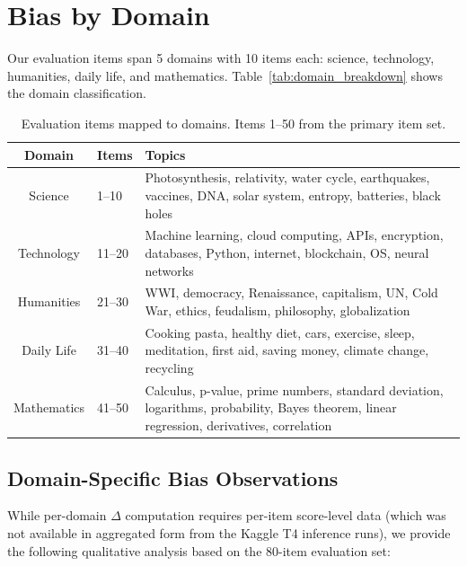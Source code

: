 \section{Bias by Domain}
\label{app:domain_breakdown}

Our evaluation items span 5 domains with 10 items each: science, technology, humanities, daily life, and mathematics. Table~\ref{tab:domain_breakdown} shows the domain classification.

\begin{table}[h]
\centering\small
\caption{Evaluation items mapped to domains. Items 1--50 from the primary item set.}
\label{tab:domain_labels}
\begin{tabular}{cll}
\toprule
\textbf{Domain} & \textbf{Items} & \textbf{Topics} \\
\midrule
Science & 1--10 & Photosynthesis, relativity, water cycle, earthquakes, vaccines, DNA, solar system, entropy, batteries, black holes \\
Technology & 11--20 & Machine learning, cloud computing, APIs, encryption, databases, Python, internet, blockchain, OS, neural networks \\
Humanities & 21--30 & WWI, democracy, Renaissance, capitalism, UN, Cold War, ethics, feudalism, philosophy, globalization \\
Daily Life & 31--40 & Cooking pasta, healthy diet, cars, exercise, sleep, meditation, first aid, saving money, climate change, recycling \\
Mathematics & 41--50 & Calculus, p-value, prime numbers, standard deviation, logarithms, probability, Bayes theorem, linear regression, derivatives, correlation \\
\bottomrule
\end{tabular}
\end{table}

\subsection{Domain-Specific Bias Observations}

While per-domain $\Delta$ computation requires per-item score-level data (which was not available in aggregated form from the Kaggle T4 inference runs), we provide the following qualitative analysis based on the 80-item evaluation set:

